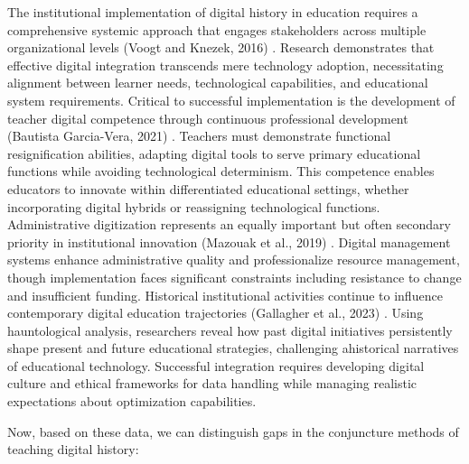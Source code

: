 The institutional implementation of digital history in education requires a comprehensive systemic approach that engages stakeholders across multiple organizational levels (Voogt and Knezek, 2016) \cite{Voogt20161}. Research demonstrates that effective digital integration transcends mere technology adoption, necessitating alignment between learner needs, technological capabilities, and educational system requirements.
Critical to successful implementation is the development of teacher digital competence through continuous professional development (Bautista Garcia-Vera, 2021) \cite{Bautista}. Teachers must demonstrate functional resignification abilities, adapting digital tools to serve primary educational functions while avoiding technological determinism. This competence enables educators to innovate within differentiated educational settings, whether incorporating digital hybrids or reassigning technological functions.
Administrative digitization represents an equally important but often secondary priority in institutional innovation (Mazouak et al., 2019) \cite{Mazouak2019267}. Digital management systems enhance administrative quality and professionalize resource management, though implementation faces significant constraints including resistance to change and insufficient funding.
Historical institutional activities continue to influence contemporary digital education trajectories (Gallagher et al., 2023) \cite{Gallagher2023643}. Using hauntological analysis, researchers reveal how past digital initiatives persistently shape present and future educational strategies, challenging ahistorical narratives of educational technology.
 Successful integration requires developing digital culture and ethical frameworks for data handling while managing realistic expectations about optimization capabilities.

Now, based on these data, we can distinguish gaps in the conjuncture methods of teaching digital history:

